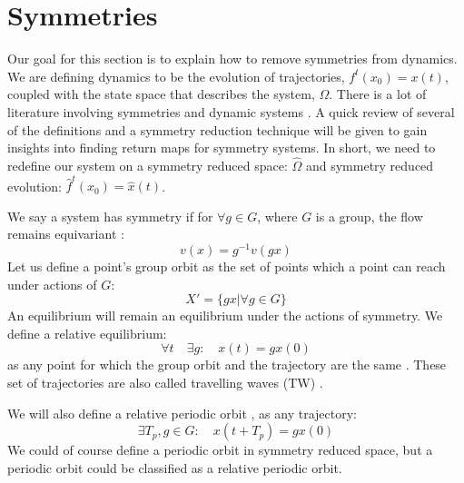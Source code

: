 \documentclass[12 pt]{article}
\begin{document}
\section{Symmetries}
\label{sec:Symm}
Our goal for this section is to explain how to remove symmetries from dynamics.  We are defining dynamics to be the evolution of trajectories, $f^{t}(x_0) = x(t)$, coupled with the state space that describes the system, $\Omega$.  There is a lot of literature involving symmetries and dynamic systems \cite{CB, Eth, SliceCond, SRetMap, Atl}.  A quick review of several of the definitions and a symmetry reduction technique will be given to gain insights into finding return maps for symmetry systems.  In short, we need to redefine our system on a symmetry reduced space: $\hat{\Omega}$ and symmetry reduced evolution: $\hat{f}^{t}(x_0) = \hat{x}(t)$.

We say a system has symmetry if for $\forall g\in G$, where $G$ is a group, the flow remains equivariant \cite{CB}:
\begin{equation}
v(x) = g^{-1}v(gx)
\label{eq:SymmEqui}
\end{equation}
Let us define a point's group orbit \cite{CB} as the set of points which a point can reach under actions of $G$:
\begin{equation}
X' = \{gx | \forall g \in G\}
\end{equation}
An equilibrium will remain an equilibrium under the actions of symmetry.  We define a relative equilibrium:
\begin{equation}
\forall t \quad \exists{g}: \quad x(t) = gx(0)
\end{equation}
as any point for which the group orbit and the trajectory are the same \cite{CB}.  These set of trajectories are also called travelling waves (TW) \cite{CB}.

We will also define a relative periodic orbit \cite{CB}, as any trajectory:
\begin{equation}
\exists{T_p}, g\in G: \quad  x(t+T_p) = gx(0)
\end{equation}
We could of course define a periodic orbit in symmetry reduced space, but a periodic orbit could be classified as a relative periodic orbit.
\end{document}
